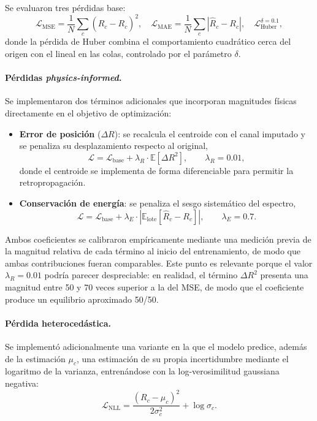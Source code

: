 Se evaluaron tres pérdidas base:
\begin{equation}
    \mathcal{L}_{\text{MSE}} = \frac{1}{N}\sum_c (\hat{R}_c - R_c)^2,
    \quad
    \mathcal{L}_{\text{MAE}} = \frac{1}{N}\sum_c |\hat{R}_c - R_c|,
    \quad
    \mathcal{L}_{\text{Huber}}^{\delta=0.1},
\end{equation}
donde la pérdida de Huber combina el comportamiento cuadrático cerca del origen con el lineal en las
colas, controlado por el parámetro $\delta$.

\paragraph{Pérdidas \emph{physics-informed}.} Se implementaron dos términos adicionales que
incorporan magnitudes físicas directamente en el objetivo de optimización:

\begin{itemize}
    \item \textbf{Error de posición} ($\Delta R$): se recalcula el centroide con el canal imputado y
    se penaliza su desplazamiento respecto al original,
    \begin{equation}
        \mathcal{L} = \mathcal{L}_{\text{base}} + \lambda_R \cdot \mathbb{E}\!\left[\Delta R^2\right],
        \qquad \lambda_R = 0.01,
    \end{equation}
    donde el centroide se implementa de forma diferenciable para permitir la retropropagación.

    \item \textbf{Conservación de energía}: se penaliza el sesgo sistemático del espectro,
    \begin{equation}
        \mathcal{L} = \mathcal{L}_{\text{base}} + \lambda_E \cdot
        \left| \mathbb{E}_{\text{lote}}\!\left[\hat{R}_c - R_c\right] \right|,
        \qquad \lambda_E = 0.7.
    \end{equation}
\end{itemize}

Ambos coeficientes se calibraron empíricamente mediante una medición previa de la magnitud relativa
de cada término al inicio del entrenamiento, de modo que ambas contribuciones fueran comparables.
Este punto es relevante porque el valor $\lambda_R = 0.01$ podría parecer despreciable: en realidad,
el término $\Delta R^2$ presenta una magnitud entre 50 y 70 veces superior a la del MSE, de modo que
el coeficiente produce un equilibrio aproximado 50/50.

\paragraph{Pérdida heterocedástica.} Se implementó adicionalmente una variante en la que el modelo
predice, además de la estimación $\mu_c$, una estimación de su propia incertidumbre mediante el
logaritmo de la varianza, entrenándose con la log-verosimilitud gaussiana negativa:
\begin{equation}
    \mathcal{L}_{\text{NLL}} = \frac{(R_c - \mu_c)^2}{2\sigma_c^2} + \log \sigma_c.
    \label{eq:nll}
\end{equation}

